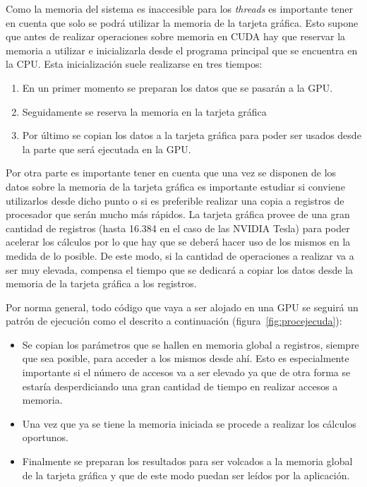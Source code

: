 Como la memoria del sistema es inaccesible para los \emph{threads} es importante tener en cuenta que solo se podrá utilizar la memoria de la tarjeta gráfica. Esto supone que antes de realizar operaciones sobre memoria en CUDA hay que reservar la memoria a utilizar e inicializarla desde el programa principal que se encuentra en la CPU. Esta inicialización suele realizarse en tres tiempos:

\begin{enumerate}

	\item En un primer momento se preparan los datos que se pasarán a la GPU.

	\item Seguidamente se reserva la memoria en la tarjeta gráfica

	\item Por último se copian los datos a la tarjeta gráfica para poder ser usados desde la parte que será ejecutada en la GPU.
\end{enumerate} 

Por otra parte es importante tener en cuenta que una vez se disponen de los datos sobre la memoria de la tarjeta gráfica es importante estudiar si conviene utilizarlos desde dicho punto o si es preferible realizar una copia a registros de procesador que serán mucho más rápidos. La tarjeta gráfica provee de una gran cantidad de registros (hasta 16.384 en el caso de las NVIDIA Tesla) para poder acelerar los cálculos por lo que hay que se deberá hacer uso de los mismos en la medida de lo posible. De este modo, si la cantidad de operaciones a realizar va a ser muy elevada, compensa el tiempo que se dedicará a copiar los datos desde la memoria de la tarjeta gráfica a los registros.

Por norma general, todo código que vaya a ser alojado en una GPU se seguirá un patrón de ejecución como el descrito a continuación (figura~\ref{fig:procejecuda}):

\begin{itemize}
	\item Se copian los parámetros que se hallen en memoria global a registros, siempre que sea posible, para acceder a los mismos desde ahí. Esto es especialmente importante si el número de accesos va a ser elevado ya que de otra forma se estaría desperdiciando una gran cantidad de tiempo en realizar accesos a memoria.
	\item Una vez que ya se tiene la memoria iniciada se procede a realizar los cálculos oportunos.
	\item Finalmente se preparan los resultados para ser volcados a la memoria global de la tarjeta gráfica y que de este modo puedan ser leídos por la aplicación.
\end{itemize}

